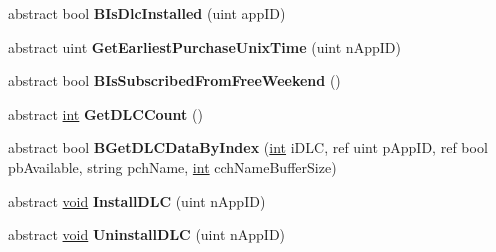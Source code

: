 \begin{DoxyCompactItemize}
\item 
\hypertarget{classValve_1_1Steamworks_1_1ISteamApps_a3370c53a6d5ca6c7d07a5898bf121eab}{}abstract bool {\bfseries B\+Is\+Dlc\+Installed} (uint app\+I\+D)\label{classValve_1_1Steamworks_1_1ISteamApps_a3370c53a6d5ca6c7d07a5898bf121eab}

\item 
\hypertarget{classValve_1_1Steamworks_1_1ISteamApps_ab4d33dc6402b631a9556a02f34787d78}{}abstract uint {\bfseries Get\+Earliest\+Purchase\+Unix\+Time} (uint n\+App\+I\+D)\label{classValve_1_1Steamworks_1_1ISteamApps_ab4d33dc6402b631a9556a02f34787d78}

\item 
\hypertarget{classValve_1_1Steamworks_1_1ISteamApps_acafdd68163f6fbc25f5e84033f478904}{}abstract bool {\bfseries B\+Is\+Subscribed\+From\+Free\+Weekend} ()\label{classValve_1_1Steamworks_1_1ISteamApps_acafdd68163f6fbc25f5e84033f478904}

\item 
\hypertarget{classValve_1_1Steamworks_1_1ISteamApps_a8601df8475470561c923c528eef34c1f}{}abstract \hyperlink{SDL__thread_8h_a6a64f9be4433e4de6e2f2f548cf3c08e}{int} {\bfseries Get\+D\+L\+C\+Count} ()\label{classValve_1_1Steamworks_1_1ISteamApps_a8601df8475470561c923c528eef34c1f}

\item 
\hypertarget{classValve_1_1Steamworks_1_1ISteamApps_afad40d11887aa32e67ff4299db15a285}{}abstract bool {\bfseries B\+Get\+D\+L\+C\+Data\+By\+Index} (\hyperlink{SDL__thread_8h_a6a64f9be4433e4de6e2f2f548cf3c08e}{int} i\+D\+L\+C, ref uint p\+App\+I\+D, ref bool pb\+Available, string pch\+Name, \hyperlink{SDL__thread_8h_a6a64f9be4433e4de6e2f2f548cf3c08e}{int} cch\+Name\+Buffer\+Size)\label{classValve_1_1Steamworks_1_1ISteamApps_afad40d11887aa32e67ff4299db15a285}

\item 
\hypertarget{classValve_1_1Steamworks_1_1ISteamApps_aa400ca6418a5e97d5e191880c7e43177}{}abstract \hyperlink{SDL__audio_8h_a52835ae37c4bb905b903cbaf5d04b05f}{void} {\bfseries Install\+D\+L\+C} (uint n\+App\+I\+D)\label{classValve_1_1Steamworks_1_1ISteamApps_aa400ca6418a5e97d5e191880c7e43177}

\item 
\hypertarget{classValve_1_1Steamworks_1_1ISteamApps_aa7ccd1307aaf66986efea6861232dce7}{}abstract \hyperlink{SDL__audio_8h_a52835ae37c4bb905b903cbaf5d04b05f}{void} {\bfseries Uninstall\+D\+L\+C} (uint n\+App\+I\+D)\label{classValve_1_1Steamworks_1_1ISteamApps_aa7ccd1307aaf66986efea6861232dce7}


\end{DoxyCompactItemize}
